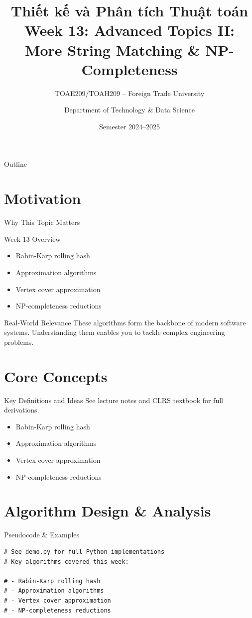 \documentclass[aspectratio=169,xcolor=dvipsnames]{beamer}
\title[Algorithms -- Week 13]{\textbf{Thiết kế và Phân tích Thuật toán}\\
  \large Week 13: Advanced Topics II: More String Matching & NP-Completeness}
\subtitle{TOAE209/TOAH209 -- Foreign Trade University}
\author{Department of Technology \& Data Science}
\date{Semester 2024--2025}
\begin{document}
\begin{frame}\titlepage\end{frame}
\begin{frame}{Outline}\tableofcontents\end{frame}

\section{Motivation}
\begin{frame}{Why This Topic Matters}
  \begin{block}{Week 13 Overview}
    \begin{itemize}
    \item Rabin-Karp rolling hash
    \item Approximation algorithms
    \item Vertex cover approximation
    \item NP-completeness reductions
    \end{itemize}
  \end{block}
  \begin{exampleblock}{Real-World Relevance}
    These algorithms form the backbone of modern software systems.
    Understanding them enables you to tackle complex engineering problems.
  \end{exampleblock}
\end{frame}

\section{Core Concepts}
\begin{frame}{Key Definitions and Ideas}
  See lecture notes and CLRS textbook for full derivations.
  \begin{itemize}
    \item Rabin-Karp rolling hash
    \item Approximation algorithms
    \item Vertex cover approximation
    \item NP-completeness reductions
  \end{itemize}
\end{frame}

\section{Algorithm Design \& Analysis}
\begin{frame}[fragile]{Pseudocode \& Examples}
  \begin{lstlisting}
# See demo.py for full Python implementations
# Key algorithms covered this week:

# - Rabin-Karp rolling hash
# - Approximation algorithms
# - Vertex cover approximation
# - NP-completeness reductions
  \end{lstlisting}
\end{frame}
\end{document}
